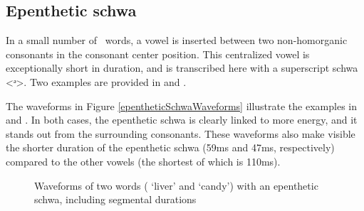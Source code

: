 \subsection{Epenthetic schwa}\label{epentheticSchwa}
In a small number of \PS\ words, a vowel is inserted between two non-homorganic consonants in the consonant center position. %
This centralized vowel is exceptionally short in duration, and is transcribed here with a superscript schwa <ᵊ>. Two examples are provided in  and .

The waveforms in Figure \vref{epentheticSchwaWaveforms} 
illustrate the examples in   
and . 
In both cases, the epenthetic schwa is clearly linked to more energy, and it stands out from the surrounding consonants. %
These waveforms also make visible the shorter duration of the epenthetic schwa (59ms and 47ms, respectively) compared to the other vowels (the shortest of which is 110ms).
\begin{figure}
\caption[Waveforms of two words with an epenthetic schwa]{Waveforms of two words ( ‘liver’ and  ‘candy’) with an epenthetic schwa, including segmental durations}\label{epentheticSchwaWaveforms}
\end{figure}


